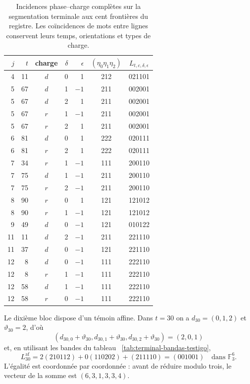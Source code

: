 \begin{table}[htbp]
\centering\small
\begin{tabular}{rrcrrc c}
\toprule
$j$&$t$&charge&$\delta$&$\epsilon$&$(\eta_0\eta_1\eta_2)$&$L_{t,c,\delta,\epsilon}$\\
\midrule
4&11&$d$&0& 1&212&021101\\
5&67&$d$&1&$-1$&211&002001\\
5&67&$d$&2& 1&211&002001\\
5&67&$r$&1&$-1$&211&002001\\
5&67&$r$&2& 1&211&002001\\
6&81&$d$&0& 1&222&020111\\
6&81&$r$&2& 1&222&020111\\
7&34&$r$&1&$-1$&111&200110\\
7&75&$d$&1&$-1$&211&200110\\
7&75&$r$&2&$-1$&211&200110\\
8&90&$r$&0& 1&121&121012\\
8&90&$r$&1&$-1$&121&121012\\
9&49&$d$&0&$-1$&121&010122\\
11&11&$d$&2&$-1$&211&221110\\
11&37&$d$&0&$-1$&121&221110\\
12&8&$d$&0&$-1$&111&222110\\
12&8&$r$&1&$-1$&111&222110\\
12&58&$d$&1&$-1$&111&222110\\
12&58&$r$&0&$-1$&111&222110\\
\bottomrule
\end{tabular}
\caption{Incidences phase--charge complètes sur la segmentation terminale  
aux cent frontières du registre. Les coïncidences de mots entre  
lignes conservent leurs temps, orientations et types de charge.}
\label{tab:terminal-incidencias-completas}
\end{table}

Le dixième bloc dispose d'un témoin affine. Dans $t=30$ on a
$d_{30}=(0,1,2)$ et $\vartheta_{30}=2$, d'où
\[
 (d_{30,0}+\vartheta_{30},d_{30,1}+\vartheta_{30},
 d_{30,2}+\vartheta_{30})=(2,0,1)
\]
et, en utilisant les bandes du tableau ~\ref{tab:terminal-bandas-testigo},
\[
 L^{\mathrm{af}}_{30}
 =2(210112)+0(110202)+(211110)
 =(001001)\quad\text{dans }\mathbb F_3^6.
\]
L'égalité est coordonnée par coordonnée : avant de réduire modulo trois,  
le vecteur de la somme est $(6,3,1,3,3,4)$.

